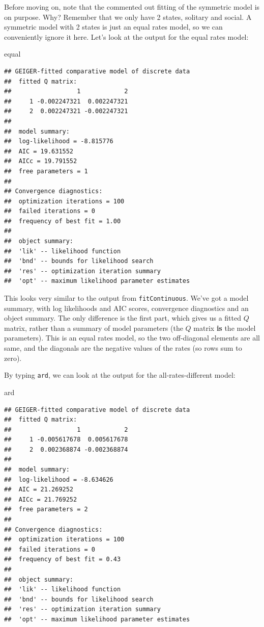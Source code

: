 \documentclass[]{book}
\newenvironment{Shaded}{\begin{snugshade}}{\end{snugshade}}
\newcommand{\NormalTok}[1]{{#1}}
\theoremstyle{definition}
\theoremstyle{definition}
\theoremstyle{definition}
\theoremstyle{remark}
\begin{document}
Before moving on, note that the commented out fitting of the symmetric
model is on purpose. Why? Remember that we only have 2 states, solitary
and social. A symmetric model with 2 states is just an equal rates
model, so we can conveniently ignore it here. Let's look at the output
for the equal rates model:

\begin{Shaded}
\begin{Highlighting}[]
\NormalTok{equal}
\end{Highlighting}
\end{Shaded}

\begin{verbatim}
## GEIGER-fitted comparative model of discrete data
##  fitted Q matrix:
##                  1            2
##     1 -0.002247321  0.002247321
##     2  0.002247321 -0.002247321
## 
##  model summary:
##  log-likelihood = -8.815776
##  AIC = 19.631552
##  AICc = 19.791552
##  free parameters = 1
## 
## Convergence diagnostics:
##  optimization iterations = 100
##  failed iterations = 0
##  frequency of best fit = 1.00
## 
##  object summary:
##  'lik' -- likelihood function
##  'bnd' -- bounds for likelihood search
##  'res' -- optimization iteration summary
##  'opt' -- maximum likelihood parameter estimates
\end{verbatim}

This looks very similar to the output from \texttt{fitContinuous}. We've
got a model summary, with log likelihoods and AIC scores, convergence
diagnostics and an object summary. The only difference is the first
part, which gives us a fitted \(Q\) matrix, rather than a summary of
model parameters (the \(Q\) matrix \textbf{is} the model parameters).
This is an equal rates model, so the two off-diagonal elements are all
same, and the diagonals are the negative values of the rates (so rows
sum to zero).

By typing \texttt{ard}, we can look at the output for the
all-rates-different model:

\begin{Shaded}
\begin{Highlighting}[]
\NormalTok{ard}
\end{Highlighting}
\end{Shaded}

\begin{verbatim}
## GEIGER-fitted comparative model of discrete data
##  fitted Q matrix:
##                  1            2
##     1 -0.005617678  0.005617678
##     2  0.002368874 -0.002368874
## 
##  model summary:
##  log-likelihood = -8.634626
##  AIC = 21.269252
##  AICc = 21.769252
##  free parameters = 2
## 
## Convergence diagnostics:
##  optimization iterations = 100
##  failed iterations = 0
##  frequency of best fit = 0.43
## 
##  object summary:
##  'lik' -- likelihood function
##  'bnd' -- bounds for likelihood search
##  'res' -- optimization iteration summary
##  'opt' -- maximum likelihood parameter estimates
\end{verbatim}
\end{document}
